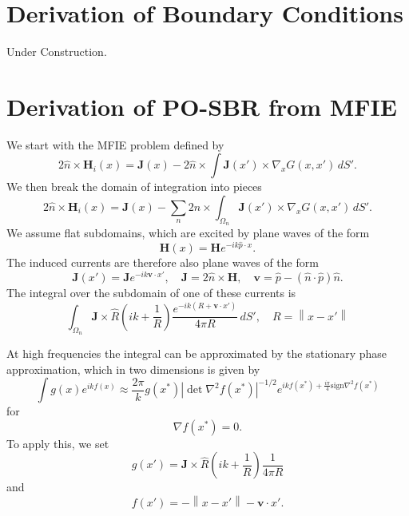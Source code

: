 \documentclass{article}
\newcommand{\norm}[1]{\left\lVert #1 \right\rVert}
\newcommand{\abs}[1]{\left\lvert #1 \right\rvert}
\theoremstyle{plain}
\begin{document}


\section{Derivation of Boundary Conditions}

Under Construction.



\section{Derivation of PO-SBR from MFIE}

We start with the MFIE problem defined by
\begin{equation}
	2\hat{n}\times\mathbf{H}_i(x)
	= \mathbf{J}(x)
	- 2\hat{n}\times\int \mathbf{J}(x') \times \nabla_{x} G(x,x') \,dS'.
\end{equation}
We then break the domain of integration into pieces
\begin{equation}
	2\hat{n}\times\mathbf{H}_i(x)
	= \mathbf{J}(x)
	- \sum_n 2\hat{n}\times\int_{\Omega_n} \mathbf{J}(x') \times \nabla_{x} G(x,x') \,dS'.
\end{equation}
We assume flat subdomains, which are excited by plane waves of the form
\begin{equation}
	\mathbf{H}(x) = \mathbf{H}e^{-ik \hat{p} \cdot x}.
\end{equation}
The induced currents are therefore also plane waves of the form
\begin{equation}
	\mathbf{J}(x') = \mathbf{J}e^{-ik \mathbf{v} \cdot x'},
	\quad \mathbf{J} = 2\hat{n}\times\mathbf{H},
	\quad \mathbf{v} = \hat{p} - \left( \hat{n}\cdot\hat{p} \right)\hat{n}.
\end{equation}
The integral over the subdomain of one of these currents is
\begin{equation}
	\int_{\Omega_n}
	\mathbf{J} \times \hat{R}
	\left( ik + \frac{1}{R} \right)
	\frac{e^{-ik\left(R + \mathbf{v} \cdot x'\right)}}{4\pi R} \,dS',
	\quad R = \norm{x-x'}
\end{equation}



At high frequencies the integral can be approximated by the stationary phase approximation,
which in two dimensions is given by
\begin{equation}
	\int g(x) e^{ikf(x)}
	\approx \frac{2\pi}{k} g(x^*)
	\abs{\det \nabla^2 f(x^*)}^{-1/2}
	e^{ikf(x^*) + \frac{i\pi}{4}\text{sign}\nabla^2 f(x^*)}
\end{equation}
for
\begin{equation}
	\nabla f(x^*) = 0.
\end{equation}
To apply this, we set
\begin{equation}
	g(x') = 
	\mathbf{J} \times \hat{R}
	\left( ik + \frac{1}{R} \right)
	\frac{1}{4\pi R}
\end{equation}
and
\begin{equation}
	f(x') = -\norm{x-x'} - \mathbf{v}\cdot x'.
\end{equation}
\end{document}
